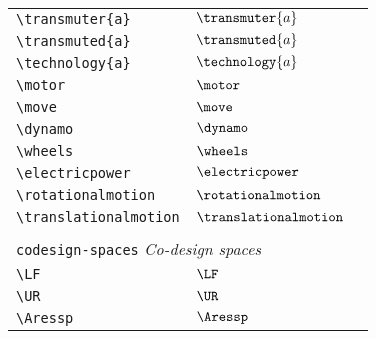 \begin{longtable}{lll}
  \\
  \hline
  \hline
  {\color[rgb]{0.5,0.5,0.5}\texttt{\textbackslash transmuter\{a\}}}                                         & $\transmuter{a}$
  & \\
  {\color[rgb]{0.5,0.5,0.5}\texttt{\textbackslash transmuted\{a\}}}                                         & $\transmuted{a}$
  & \\
  {\color[rgb]{0.5,0.5,0.5}\texttt{\textbackslash technology\{a\}}}                                         & $\technology{a}$
  & \\
  {\color[rgb]{0.5,0.5,0.5}\texttt{\textbackslash motor}}                                                   & $\motor$                   & \\
  {\color[rgb]{0.5,0.5,0.5}\texttt{\textbackslash move}}                                                    & $\move$                    & \\
  {\color[rgb]{0.5,0.5,0.5}\texttt{\textbackslash dynamo}}                                                  & $\dynamo$                  & \\
  {\color[rgb]{0.5,0.5,0.5}\texttt{\textbackslash wheels}}                                                  & $\wheels$                  & \\
  {\color[rgb]{0.5,0.5,0.5}\texttt{\textbackslash electricpower}}                                           & $\electricpower$
  & \\
  {\color[rgb]{0.5,0.5,0.5}\texttt{\textbackslash rotationalmotion}}                                        & $\rotationalmotion$
  & \\
  {\color[rgb]{0.5,0.5,0.5}\texttt{\textbackslash translationalmotion}}                                     & $\translationalmotion$
  &
  \\
  &                            &                                                         \\
  \multicolumn{3}{l}{{\color[rgb]{0.5,0.5,0.5}\texttt{codesign-spaces}} \emph{Co-design spaces}}
  \\
  \hline
  \hline
  {\color[rgb]{0.5,0.5,0.5}\texttt{\textbackslash LF}}                                                      & $\LF$                      & \\
  {\color[rgb]{0.5,0.5,0.5}\texttt{\textbackslash UR}}                                                      & $\UR$                      & \\
  {\color[rgb]{0.5,0.5,0.5}\texttt{\textbackslash Aressp}}                                                  & $\Aressp$                  & \\

\end{longtable}
